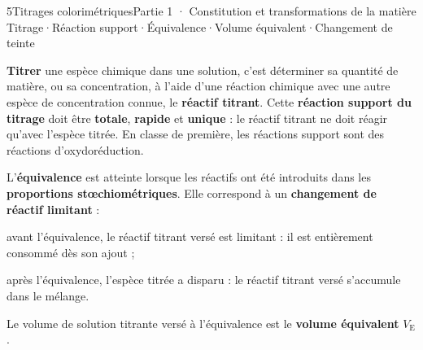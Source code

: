 \begin{ouverture}[colorimetrie]{5}{Titrages colorimétriques}{Partie 1 · Constitution et transformations de la matière}
{Titrage\enspace·\enspace Réaction support\enspace·\enspace Équivalence\enspace·\enspace Volume équivalent\enspace·\enspace Changement de teinte}
\end{ouverture}
\essentiel
{}
\begin{definition}
\textbf{Titrer} une espèce chimique dans une solution, c'est déterminer sa quantité de matière, ou sa concentration, à
l'aide d'une réaction chimique avec une autre espèce de concentration connue, le \textbf{réactif titrant}. Cette
\textbf{réaction support du titrage} doit être \textbf{totale}, \textbf{rapide} et \textbf{unique} : le réactif titrant ne doit réagir
qu'avec l'espèce titrée. En classe de première, les réactions support sont des réactions d'oxydoréduction.
\end{definition}
\begin{definition}
L'\textbf{équivalence} est atteinte lorsque les réactifs ont été introduits dans les \textbf{proportions stœchiométriques}. Elle
correspond à un \textbf{changement de réactif limitant} :
\begin{questions}
\item avant l'équivalence, le réactif titrant versé est limitant : il est entièrement consommé dès son ajout ;
\item après l'équivalence, l'espèce titrée a disparu : le réactif titrant versé s'accumule dans le mélange.
\end{questions}
Le volume de solution titrante versé à l'équivalence est le \textbf{volume équivalent} $V_\mathrm{E}$.
\end{definition}
